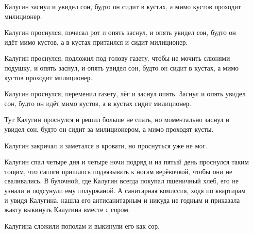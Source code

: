 Калугин заснул и увидел сон, будто он сидит в кустах, а мимо кустов проходит милиционер.

Калугин проснулся, почесал рот и опять заснул, и опять увидел сон, будто он идёт мимо кустов, а в кустах притаился и сидит милиционер.

Калугин проснулся, подложил под голову газету, чтобы не мочить слюнями подушку, и опять заснул, и опять увидел сон, будто он сидит в кустах, а мимо кустов проходит милиционер.

Калугин проснулся, переменил газету, лёг и заснул опять. Заснул и опять увидел сон, будто он идёт мимо кустов, а в кустах сидит милиционер.

Тут Калугин проснулся и решил больше не спать, но моментально заснул и увидел сон, будто он сидит за милиционером, а мимо проходят кусты.

Калугин закричал и заметался в кровати, но проснуться уже не мог.

Калугин спал четыре дня и четыре ночи подряд и на пятый день проснулся таким тощим, что сапоги пришлось подвязывать к ногам верёвочкой, чтобы они не сваливались. В булочной, где Калугин всегда покупал пшеничный хлеб, его не узнали и подсунули ему полуржаной. А санитарная комиссия, ходя по квартирам и увидя Калугина, нашла его антисанитарным и никуда не годным и приказала жакту выкинуть Калугина вместе с сором.

Калугина сложили пополам и выкинули его как сор.
